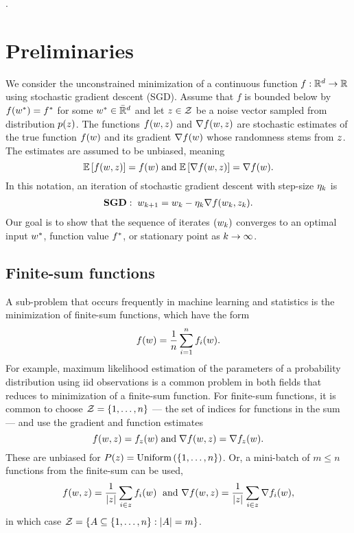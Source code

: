 
.

\section{Preliminaries}\label{sec:setup}

We consider the unconstrained minimization of a continuous function \( f : \mathbb{R}^d \rightarrow \mathbb{R} \) using stochastic gradient descent (SGD).
Assume that \( f \) is bounded below by \( f(w^*) = f^* \) for some \( w^* \in \bar {\mathbb{R}}^d \) and let \( z \in \mathcal{Z} \) be a noise vector sampled from distribution \( p(z) \).
The functions \( f(w,z) \) and \( \nabla f(w, z) \) are stochastic estimates of the true function \( f(w) \) and its gradient \(\nabla f(w) \) whose randomness stems from \( z \).
The estimates are assumed to be unbiased, meaning
\[ \mathbb{E} \left[f(w, z)\right] = f(w)  \; \text{and} \; \mathbb{E} \left[ \nabla f(w, z) \right] = \nabla f(w). \]
In this notation, an iteration of stochastic gradient descent with step-size \( \eta_k \) is
\begin{align}
    \textbf{SGD}: \; w_{k+1} = w_k - \eta_k \nabla f(w_k, z_{k}). \label{eq:sgd}
\end{align}
Our goal is to show that the sequence of iterates \( \left(w_k\right) \) converges to an optimal input \( w^* \), function value \( f^* \), or stationary point as \( k \rightarrow \infty \).

\subsection{Finite-sum functions}\label{sec:finite_sum}

A sub-problem that occurs frequently in machine learning and statistics is the minimization of finite-sum functions, which have the form
\[ f(w) = \frac{1}{n} \sum_{i=1}^n f_i(w). \]
For example, maximum likelihood estimation of the parameters of a probability distribution using iid observations is a common problem in both fields that reduces to minimization of a finite-sum function.
For finite-sum functions, it is common to choose \( \mathcal{Z} = \left\{1, \dots, n\right\} \) --- the set of indices for functions in the sum --- and use the gradient and function estimates
\[f(w, z) = f_z(w) \; \text{and} \; \nabla f(w, z) = \nabla f_z(w). \]
These are unbiased for \( P(z) = \text{Uniform}\left(\left\{1, \dots, n\right\}\right) \).
Or, a mini-batch of \( m \leq n \) functions from the finite-sum can be used,
\[ f(w, z) = \frac{1}{|z|} \sum_{i \in z} f_i(w) \; \text{ and } \nabla f(w, z) = \frac{1}{|z|} \sum_{i \in z} \nabla f_i(w), \]
in which case \( \mathcal{Z} = \left\{ A \subseteq \left\{1, \dots, n\right\} : |A| = m \right\} \).

